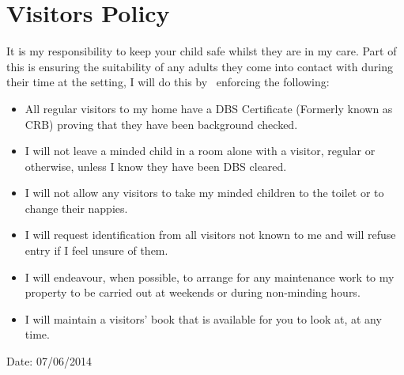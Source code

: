 

\section{Visitors Policy}

It is my responsibility to keep your child safe whilst they are in my
care. Part of this is ensuring the suitability of any adults they come
into contact with during their time at the setting, I will do this by
~enforcing the following:

\begin{itemize}
\item
  All regular visitors to my home have a DBS Certificate (Formerly
  known as CRB) proving that they have been background checked. ~
\end{itemize}

\begin{itemize}
\item
  I will not leave a minded child in a room alone with a visitor,
  regular or otherwise, unless I know they have been DBS cleared.~
\item
  I will not allow any visitors to take my minded children to the
  toilet or to change their nappies.~
\end{itemize}

\begin{itemize}
\item
  I will request identification from all visitors not known to me and
  will refuse entry if I feel unsure of them. ~
\end{itemize}

\begin{itemize}
\item
  I will endeavour, when possible, to arrange for any maintenance work
  to my property to be carried out at weekends or during non-minding
  hours. ~
\end{itemize}

\begin{itemize}
\item
  I will maintain a visitors' book that is available for you to look
  at, at any time.~
\end{itemize}

Date: 07/06/2014


